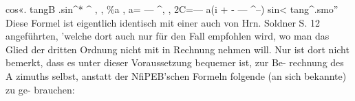\documentclass[12pt,a4paper]{article}
\begin{document}
cos«. tangB .sin\^{}* \^{} , , \%a ,\newline
a= --- \^{}, , 2C=--- a(i + - --- \^{}--)\newline
sin< tang\^{}.smo''\newline
Diese Formel ist eigentlich identisch mit einer auch von Hrn. Soldner S. 12 angeführten, 'welche dort\newline
auch nur für den Fall empfohlen wird, wo man das Glied der dritten Ordnung nicht mit in Rechnung\newline
nehmen will. Nur ist dort nicht bemerkt, dass es unter dieser Voraussetzung bequemer ist, zur Be-\newline
rechnung des A zimuths selbst, anstatt der NfiPEB'schen Formeln folgende (an sich bekannte) zu ge-\newline
brauchen:\newline
\end{document}
